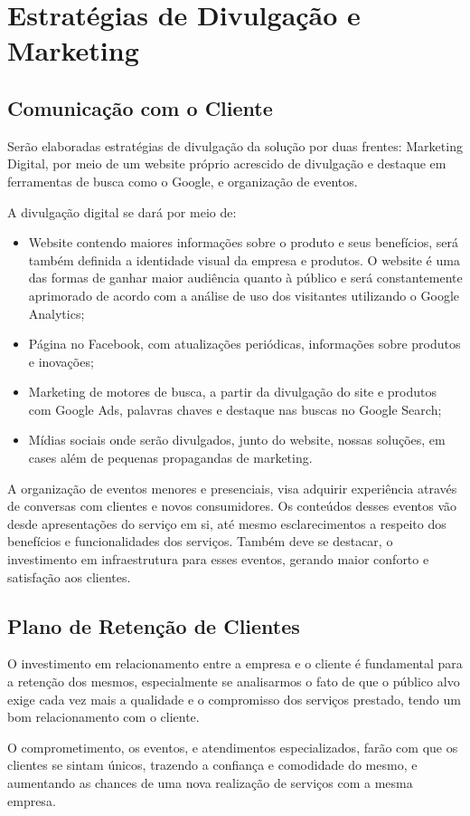 \section{Estratégias de Divulgação e Marketing}

\subsection{Comunicação com o Cliente}
\par Serão elaboradas estratégias de divulgação da solução por duas frentes: Marketing Digital, por meio de um website próprio acrescido de divulgação e destaque em ferramentas de busca como o Google, e organização de eventos.
\par A divulgação digital se dará por meio de:
\begin{itemize}
    \item Website contendo maiores informações sobre o produto e seus benefícios, será também definida a identidade visual da empresa e produtos. O website é uma das formas de ganhar maior audiência quanto à público e será constantemente aprimorado de acordo com a análise de uso dos visitantes utilizando o Google Analytics;
    \item Página no Facebook, com atualizações periódicas, informações sobre produtos e inovações;
    \item Marketing de motores de busca, a partir da divulgação do site e produtos com Google Ads, palavras chaves e destaque nas buscas no Google Search;
    \item Mídias sociais onde serão divulgados, junto do website, nossas soluções, em cases além de pequenas propagandas de marketing.
\end{itemize}
\par A organização de eventos menores e presenciais, visa adquirir experiência através de conversas com clientes e novos consumidores. Os conteúdos desses eventos vão desde apresentações do serviço em si, até mesmo esclarecimentos a respeito dos benefícios e funcionalidades dos serviços. Também deve se destacar, o investimento em infraestrutura para esses eventos, gerando maior conforto e satisfação aos clientes.

\subsection{Plano de Retenção de Clientes}
\par O investimento em relacionamento entre a empresa e o cliente é fundamental para a retenção dos mesmos, especialmente se analisarmos o fato de que o público alvo exige cada vez mais a qualidade e o compromisso dos serviços prestado, tendo um bom relacionamento com o cliente.
\par O comprometimento, os eventos, e atendimentos especializados, farão com que os clientes se sintam únicos, trazendo a confiança e comodidade do mesmo, e aumentando as chances de uma nova realização de serviços com a mesma empresa.

